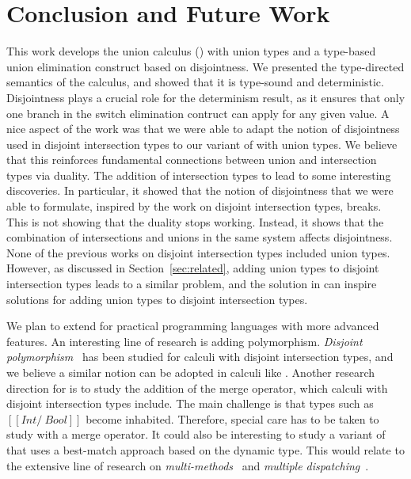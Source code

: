 \section{Conclusion and Future Work}
\label{sec:conclusion}

This work develops the union calculus (\cal) with union types and a
type-based union elimination construct based on disjointness. We presented the
type-directed semantics of the calculus, and showed that it is
type-sound and deterministic. Disjointness plays a crucial role for
the determinism result, as it ensures that only one branch in the
switch elimination contruct can apply for any given value. A nice
aspect of the work was that we were able to adapt the notion of
disjointness used in disjoint intersection types to our variant of
\name with union types. We believe that this reinforces fundamental
connections between union and intersection types via duality.  The
addition of intersection types to \name lead to some interesting
discoveries.  In particular, it showed that the notion of disjointness
that we were able to formulate, inspired by the work on disjoint
intersection types, breaks.  This is not showing that the duality stops
working. Instead, it shows that the combination of intersections
and unions in the same system affects disjointness. None of the
previous works on disjoint intersection types included union
types. However, as discussed in Section~\ref{sec:related}, adding
union types to disjoint intersection types leads to a similar problem,
and the solution in \name can inspire solutions for adding union types to
disjoint intersection types.

We plan to extend \cal for practical programming languages with more
advanced features. An interesting line of research is adding polymorphism.
\emph{Disjoint polymorphism}~\cite{alpuimdisjoint} has been studied for
calculi with disjoint intersection
types, and we believe a similar notion can be adopted in calculi like \name.
Another research direction for \cal is to study
the addition of the merge operator, which calculi with disjoint
intersection types include. The main challenge is that types such as
$[[Int /\ Bool]]$ become inhabited. 
Therefore, special care has to be taken
to study \cal with a merge operator.
It could also be interesting to study a variant of \name that uses
a best-match approach based on the dynamic type. This would relate
to the extensive line of research on \emph{multi-methods}~\cite{Chambers92}
and \emph{multiple dispatching}~\cite{CliftonLCM2000}. 


\begin{comment}
Another domain of future interest
is to embed dynamic dispatch in \cal by defining a weak and more
expressive disjointness. Dynamic dispatch will allow type checking
more programs.
\end{comment}
